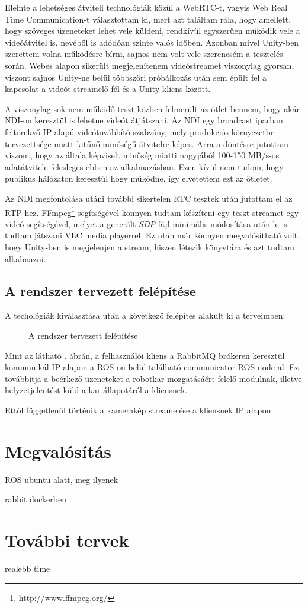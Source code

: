 \documentclass[11pt,a4paper,oneside]{article}
\newcommand{\afigref}[1]{\aref{fig:#1}.}
\newcommand{\insertfig}[4]{
	\vspace*{2mm}
	\begin{figure}[#4]
		\center
		\resizebox{#3}{!}{\texttt{[image: images/\#1]}}
		\parbox{0.8\textwidth}{\vspace*{4mm}\caption{{#2}}\small\label{fig:#1}}
	\end{figure}
	\vspace*{-2\parskip}
}
\begin{document}
Eleinte a lehetséges átviteli technológiák közül a WebRTC-t, vagyis Web Real Time Communication-t választottam ki, mert azt találtam róla, hogy amellett, hogy szöveges üzeneteket lehet vele küldeni, rendkívül egyszerűen működik vele a videóátvitel is, nevéből is adódóan szinte valós időben. Azonban mivel Unity-ben szerettem volna működésre bírni, sajnos nem volt vele szerencsém a tesztelés során. Webes alapon sikerült megjelenítenem videóstreamet viszonylag gyorsan, viszont sajnos Unity-ne belül többszöri próbálkozás után sem épült fel a kapcsolat a videót streamelő fél és a Unity kliens között.

A viszonylag sok nem működő teszt közben felmerült az ötlet bennem, hogy akár NDI-on keresztül is lehetne videót átjátszani. Az NDI egy broadcast iparban feltörekvő IP alapú videótovábbító szabvány, mely produkciós környezetbe tervezettsége miatt kitűnő minőségű átvitelre képes. Arra a döntésre jutottam viszont, hogy az általa képviselt minőség miatti nagyjából 100-150 MB/s-os adatátvitele felesleges ebben az alkalmazásban. Ezen kívül nem tudom, hogy publikus hálózaton keresztül hogy működne, így elvetettem ezt az ötletet.

Az NDI megfontolása utáni további sikertelen RTC tesztek után jutottam el az RTP-hez. FFmpeg\footnote{http://www.ffmpeg.org/} segítségével könnyen tudtam készíteni egy teszt streamet egy videó segítségével, melyet a generált \textit{SDP} fájl minimális módosítása után le is tudtam játszani VLC media playerrel. Ez után már könnyen megvalósítható volt, hogy Unity-ben is megjelenjen a stream, hiszen létezik könyvtára és azt tudtam alkalmazni.

\subsection{A rendszer tervezett felépítése}

A techológiák kiválasztása után a következő felépítés alakult ki a terveimben:

\insertfig{felepites}{A rendszer tervezett felépítése}{7.5cm}{h!}

Mint az látható \afigref{felepites} ábrán, a felhasználói kliens a RabbitMQ brókeren keresztül kommunikál IP alapon a ROS-on belül található communicator ROS node-al. Ez továbbítja a beérkező üzeneteket a robotkar mozgatásáért felelő modulnak, illetve helyzetjelentést küld a kar állapotáról a kliensnek.

Ettől függetlenül történik a kamerakép streamelése a kliensnek IP alapon.

\newpage
\section{Megvalósítás}

ROS ubuntu alatt, meg ilyenek

rabbit dockerben

\section{További tervek}

realebb time
\end{document}
